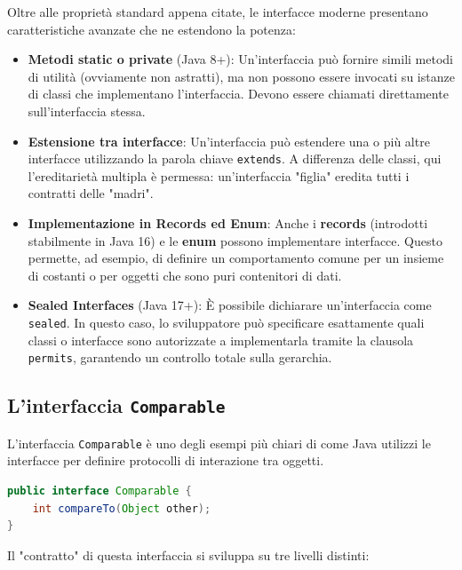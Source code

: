 Oltre alle proprietà standard appena citate, le interfacce moderne presentano caratteristiche avanzate che ne estendono la potenza:

\begin{itemize}
    \item \textbf{Metodi static o private} (Java 8+): Un'interfaccia può fornire simili metodi di utilità (ovviamente non astratti), ma non possono essere invocati su istanze di classi che implementano l'interfaccia. Devono essere chiamati direttamente sull'interfaccia stessa.
    \item \textbf{Estensione tra interfacce}: Un'interfaccia può estendere una o più altre interfacce utilizzando la parola chiave \texttt{extends}. A differenza delle classi, qui l'ereditarietà multipla è permessa: un'interfaccia "figlia" eredita tutti i contratti delle "madri".
    \item \textbf{Implementazione in Records ed Enum}: Anche i \textbf{records} (introdotti stabilmente in Java 16) e le \textbf{enum} possono implementare interfacce. Questo permette, ad esempio, di definire un comportamento comune per un insieme di costanti o per oggetti che sono puri contenitori di dati.
    \item \textbf{Sealed Interfaces} (Java 17+): È possibile dichiarare un'interfaccia come \texttt{sealed}. In questo caso, lo sviluppatore può specificare esattamente quali classi o interfacce sono autorizzate a implementarla tramite la clausola \texttt{permits}, garantendo un controllo totale sulla gerarchia.
\end{itemize}


\subsection{L'interfaccia \texttt{Comparable}}
L'interfaccia \texttt{Comparable} è uno degli esempi più chiari di come Java utilizzi le interfacce per definire protocolli di interazione tra oggetti.

\begin{lstlisting}[language=Java]
public interface Comparable {
    int compareTo(Object other);
}
\end{lstlisting}

Il "contratto" di questa interfaccia si sviluppa su tre livelli distinti:

